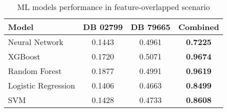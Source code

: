 \begin{table}[ht]
  \centering
  \caption{ML models performance in feature-overlapped scenario}
  \label{tab:hfl_ml_models_comparison}
  \begin{tabular}{lccc}
  \toprule
  \textbf{Model} & \textbf{DB 02799} & \textbf{DB 79665} & \textbf{Combined} \\
  \midrule
  Neural Network & 0.1443 & 0.4961 & \textbf{0.7225} \\
  XGBoost & 0.1720 & 0.5071 & \textbf{0.9674} \\
  Random Forest & 0.1877 & 0.4991 & \textbf{0.9619} \\
  Logistic Regression & 0.1406 & 0.4663 & \textbf{0.8499} \\
  SVM & 0.1428 & 0.4733 & \textbf{0.8608} \\
  \bottomrule
  \end{tabular}
  \end{table}